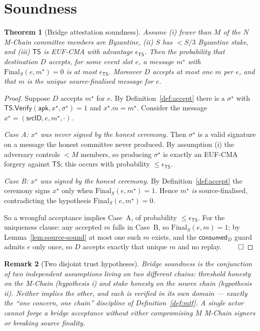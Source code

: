 \documentclass[11pt]{article}
\newtheorem{theorem}{Theorem}
\newtheorem{remark}[theorem]{Remark}
\begin{document}
\section{Soundness}
\label{sec:soundness}

\begin{theorem}[Bridge attestation soundness]
\label{thm:bridge}
Assume (i) fewer than $M$ of the $N$ M-Chain committee members are
Byzantine, (ii) $S$ has $<S/3$ Byzantine stake, and (iii)
$\mathsf{TS}$ is EUF-CMA with advantage $\epsilon_{\mathsf{TS}}$. Then
the probability that destination $D$ accepts, for some event slot $e$,
a message $m^\star$ with $\mathrm{Final}_S(e,m^\star)=0$ is at most
$\epsilon_{\mathsf{TS}}$. Moreover $D$ accepts at most one $m$ per $e$,
and that $m$ is the unique source-finalised message for $e$.
\end{theorem}
\begin{proof}
Suppose $D$ accepts $m^\star$ for $e$. By
Definition~\ref{def:accept} there is a $\sigma^\star$ with
$\mathsf{TS}.\mathsf{Verify}(\mathsf{apk}, x^\star, \sigma^\star)=1$ and
$x^\star.m = m^\star$. Consider the message $x^\star = (\mathsf{srcID},
e, m^\star, \cdot)$.

\emph{Case A: $x^\star$ was never signed by the honest ceremony.} Then
$\sigma^\star$ is a valid signature on a message the honest committee
never produced. By assumption (i) the adversary controls $<M$ members,
so producing $\sigma^\star$ is exactly an EUF-CMA forgery against
$\mathsf{TS}$; this occurs with probability $\le \epsilon_{\mathsf{TS}}$.

\emph{Case B: $x^\star$ was signed by the honest ceremony.} By
Definition~\ref{def:accept} the ceremony signs $x^\star$ only when
$\mathrm{Final}_S(e, m^\star)=1$. Hence $m^\star$ \emph{is}
source-finalised, contradicting the hypothesis
$\mathrm{Final}_S(e,m^\star)=0$.

So a wrongful acceptance implies Case~A, of probability
$\le\epsilon_{\mathsf{TS}}$. For the uniqueness clause: any accepted $m$
falls in Case~B, so $\mathrm{Final}_S(e,m)=1$; by
Lemma~\ref{lem:source-sound} at most one such $m$ exists, and the
$\mathsf{consumed}_D$ guard admits $e$ only once, so $D$ accepts exactly
that unique $m$ and no replay. $\qed$
\end{proof}

\begin{remark}[Two disjoint trust hypotheses]
\label{rem:two-hyp}
Bridge soundness is the \emph{conjunction} of two independent
assumptions living on two different chains: threshold honesty on the
M-Chain (hypothesis i) and stake honesty on the source chain
(hypothesis ii). Neither implies the other, and each is verified in its
own domain --- exactly the ``one concern, one chain'' discipline of
Definition~\ref{def:mtf}. A single actor cannot forge a bridge
acceptance without either compromising $M$ M-Chain signers or breaking
source finality.
\end{remark}
\end{document}
